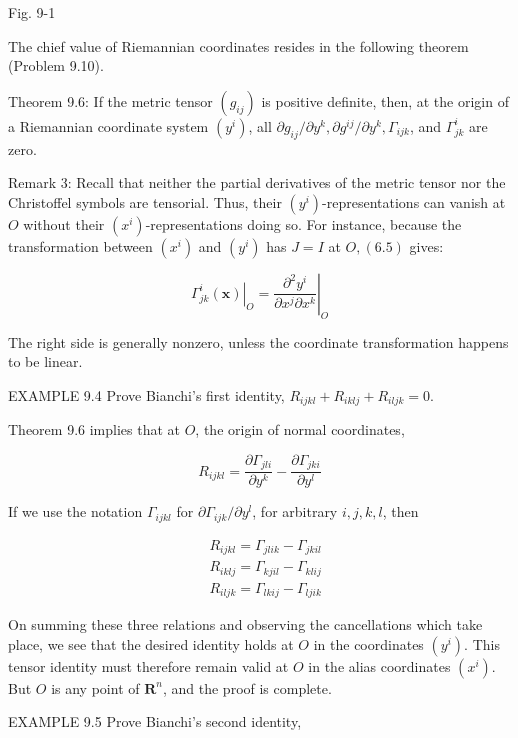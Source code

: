 \documentclass[10pt]{article}
\begin{document}
Fig. 9-1

The chief value of Riemannian coordinates resides in the following theorem (Problem 9.10).

Theorem 9.6: If the metric tensor $\left(g_{i j}\right)$ is positive definite, then, at the origin of a Riemannian coordinate system $\left(y^{i}\right)$, all $\partial g_{i j} / \partial y^{k}, \partial g^{i j} / \partial y^{k}, \Gamma_{i j k}$, and $\Gamma_{j k}^{i}$ are zero.

Remark 3: Recall that neither the partial derivatives of the metric tensor nor the Christoffel symbols are tensorial. Thus, their $\left(y^{i}\right)$-representations can vanish at $O$ without their $\left(x^{i}\right)$-representations doing so. For instance, because the transformation between $\left(x^{i}\right)$ and $\left(y^{i}\right)$ has $J=I$ at $O,(6.5)$ gives:

$$
\left.\Gamma_{j k}^{i}(\mathbf{x})\right|_{O}=\left.\frac{\partial^{2} y^{i}}{\partial x^{j} \partial x^{k}}\right|_{O}
$$

The right side is generally nonzero, unless the coordinate transformation happens to be linear.

EXAMPLE 9.4 Prove Bianchi's first identity, $R_{i j k l}+R_{i k l j}+R_{i l j k}=0$.

Theorem 9.6 implies that at $O$, the origin of normal coordinates,

$$
R_{i j k l}=\frac{\partial \Gamma_{j l i}}{\partial y^{k}}-\frac{\partial \Gamma_{j k i}}{\partial y^{l}}
$$

If we use the notation $\Gamma_{i j k l}$ for $\partial \Gamma_{i j k} / \partial y^{l}$, for arbitrary $i, j, k, l$, then

$$
\begin{aligned}
& R_{i j k l}=\Gamma_{j l i k}-\Gamma_{j k i l} \\
& R_{i k l j}=\Gamma_{k j i l}-\Gamma_{k l i j} \\
& R_{i l j k}=\Gamma_{l k i j}-\Gamma_{l j i k}
\end{aligned}
$$

On summing these three relations and observing the cancellations which take place, we see that the desired identity holds at $O$ in the coordinates $\left(y^{i}\right)$. This tensor identity must therefore remain valid at $O$ in the alias coordinates $\left(x^{i}\right)$. But $O$ is any point of $\mathbf{R}^{n}$, and the proof is complete.

EXAMPLE 9.5 Prove Bianchi's second identity,
\end{document}
